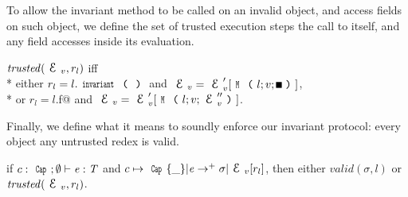 \noindent 
To allow the invariant method to be called on an invalid object, and access fields on such object, we define the set of trusted execution steps  the call to \Q@invariant@ itself, and any field accesses inside its evaluation. 

\loseSpace
\noindent $\mathit{trusted}(\ctx_v,r_l)$ iff\\*
\indent either
$r_l=l.\invariant$ and
$\ctx_v=\ctx_v'[\Kw{M}\oR l;v;\square\cR]$,\\*
\indent or
$r_l=l$\Q@.f@ and
$\ctx_v=\ctx_v'[\Kw{M}\oR l;v;\ctx_v''\cR]$.
\loseSpace

\noindent Finally, we define what it means to soundly enforce our invariant protocol: every object  any untrusted redex is valid.

\begin{theorem}[Soundness]
if $c:\Kw{Cap};\emptyset\vdash \e: \T$ and
$c\mapsto\Kw{Cap}\{\_\}|\e\rightarrow^+ \sigma|\ctx_v[r_l]$, then
either $\mathit{valid}(\sigma,l)$ or $\mathit{trusted}(\ctx_v,r_l)$.
\end{theorem}


